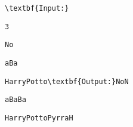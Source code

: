 \begin{verbatim}
\textbf{Input:}\end{verbatim}
\begin{verbatim}
3\end{verbatim}
\begin{verbatim}
No\end{verbatim}
\begin{verbatim}
aBa\end{verbatim}
\begin{verbatim}
HarryPotto\textbf{Output:}NoN\end{verbatim}
\begin{verbatim}
aBaBa\end{verbatim}
\begin{verbatim}
HarryPottoPyrraH\end{verbatim}